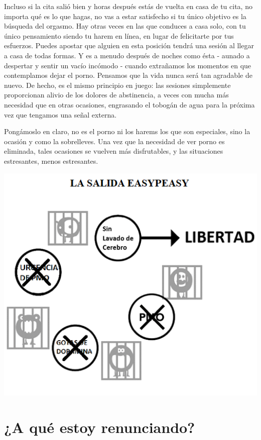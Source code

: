\documentclass[
  spanish,
  openany]{book}
\begin{document}
Incluso si la cita salió bien y horas después estás de vuelta en casa de tu cita, no importa qué es lo que hagas, no vas a estar satisfecho si tu único objetivo es la búsqueda del orgasmo. Hay otras veces en las que conduces a casa solo, con tu único pensamiento siendo tu harem en línea, en lugar de felicitarte por tus esfuerzos. Puedes apostar que alguien en esta posición tendrá una sesión al llegar a casa de todas formas. Y es a menudo después de noches como ésta - aunado a despertar y sentir un vacío incómodo - cuando extrañamos los momentos en que contemplamos dejar el porno. Pensamos que la vida nunca será tan agradable de nuevo. De hecho, es el mismo principio en juego: las sesiones simplemente proporcionan alivio de los dolores de abstinencia, a veces con mucha más necesidad que en otras ocasiones, engrasando el tobogán de agua para la próxima vez que tengamos una señal externa.

Pongámoslo en claro, no es el porno ni los harems los que son especiales, sino la ocasión y como la sobrelleves. Una vez que la necesidad de ver porno es eliminada, tales ocasiones se vuelven más disfrutables, y las situaciones estresantes, menos estresantes.

\includegraphics{img-la-salida-easypeasy.png}\\

\hypertarget{a-que-estoy-renunciando}{%
\chapter{¿A qué estoy renunciando?}\label{a-que-estoy-renunciando}}
\end{document}

